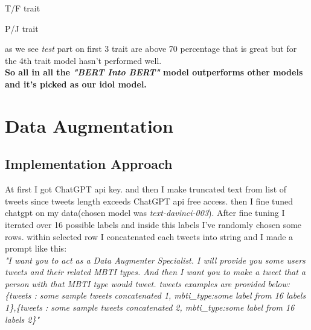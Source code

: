 \documentclass[10pt, a4paper]{article}
\begin{document}
\begin{center}
    \begin{adjustbox}{max width=0.8\textwidth}
    \end{adjustbox}
\end{center}
\begin{center}
    T/F trait
\end{center}

\begin{center}
    \begin{adjustbox}{max width=0.8\textwidth}
    \end{adjustbox}
\end{center}
\begin{center}
    P/J trait
\end{center}
as we see \textit{test} part on first 3 trait are above 70 percentage that is great but for the 4th trait model hasn't performed well.
\\
\textbf{So all in all the \textit{"BERT Into BERT"} model outperforms other models and it's picked as our idol model.}

\section{Data Augmentation}
\subsection{Implementation Approach}
At first I got ChatGPT api key. and then I make truncated text from list of tweets since tweets length exceeds ChatGPT api free access.
then I fine tuned chatgpt on my data(chosen model was \textit{text-davinci-003}). After fine tuning I iterated over 16 possible labels and inside this labels I've randomly chosen some rows.
within selected row I concatenated each tweets into string and I made a prompt like this:
\\
\textit{"I want you to act as a Data Augmenter Specialist. I will provide you some users tweets and their related MBTI types.
    And then I want you to make a tweet that a person with that MBTI type would tweet. tweets examples are provided below:
    \{tweets : \textit{some sample tweets concatenated 1}, mbti\_type:\textit{some label from 16 labels 1}\},\{tweets : \textit{some sample tweets concatenated 2}, mbti\_type:\textit{some label from 16 labels 2}\}"}
\end{document}

